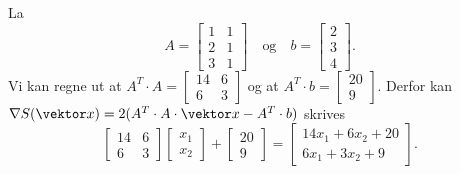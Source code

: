 La 
$$A = \begin{bmatrix}1 & 1 \\ 2 & 1 \\ 3 & 1\end{bmatrix} \quad \text{og} \quad
b = \begin{bmatrix}2 \\ 3 \\ 4\end{bmatrix}.$$
Vi kan regne ut at $A^T \cdot A = \begin{bmatrix}14 & 6 \\ 6 & 3\end{bmatrix}$ og
at $A^T \cdot b = \begin{bmatrix}20 \\ 9\end{bmatrix}$. Derfor kan
$\nabla S(\vektor x) = 2(A^T \cdot A \cdot \vektor x - A^T \cdot b)$ skrives
$$\begin{bmatrix}14 & 6 \\ 6 & 3\end{bmatrix} \begin{bmatrix}x_1 \\ x_2\end{bmatrix} + 
\begin{bmatrix}20 \\ 9\end{bmatrix} = \begin{bmatrix}14x_1 + 6x_2 + 20 \\ 6x_1 + 3x_2 + 9\end{bmatrix}.$$
